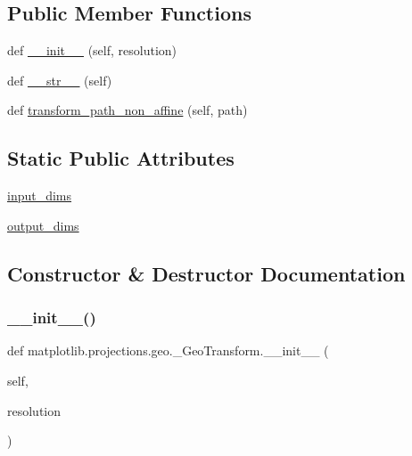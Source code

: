\subsection*{Public Member Functions}
\begin{DoxyCompactItemize}
\item 
def \hyperlink{classmatplotlib_1_1projections_1_1geo_1_1__GeoTransform_a7c152cfc14213b0cb580c27e2e8c8da2}{\+\_\+\+\_\+init\+\_\+\+\_\+} (self, resolution)
\item 
def \hyperlink{classmatplotlib_1_1projections_1_1geo_1_1__GeoTransform_a323d5869e2cdb40475906e153d2909e4}{\+\_\+\+\_\+str\+\_\+\+\_\+} (self)
\item 
def \hyperlink{classmatplotlib_1_1projections_1_1geo_1_1__GeoTransform_a1eef09faf5ded39c2321b606b987668c}{transform\+\_\+path\+\_\+non\+\_\+affine} (self, path)
\end{DoxyCompactItemize}
\subsection*{Static Public Attributes}
\begin{DoxyCompactItemize}
\item 
\hyperlink{classmatplotlib_1_1projections_1_1geo_1_1__GeoTransform_acce37dd1352e25485a6ea508a209e20b}{input\+\_\+dims}
\item 
\hyperlink{classmatplotlib_1_1projections_1_1geo_1_1__GeoTransform_a9f51be998f1b4dc39b58f3b5cf58f033}{output\+\_\+dims}
\end{DoxyCompactItemize}


\subsection{Constructor \& Destructor Documentation}
\mbox{\label{classmatplotlib_1_1projections_1_1geo_1_1__GeoTransform_a7c152cfc14213b0cb580c27e2e8c8da2}} 
\subsubsection{\texorpdfstring{\+\_\+\+\_\+init\+\_\+\+\_\+()}{\_\_init\_\_()}}
{\footnotesize\ttfamily def matplotlib.\+projections.\+geo.\+\_\+\+Geo\+Transform.\+\_\+\+\_\+init\+\_\+\+\_\+ (\begin{DoxyParamCaption}\item[{}]{self,  }\item[{}]{resolution }\end{DoxyParamCaption})}

